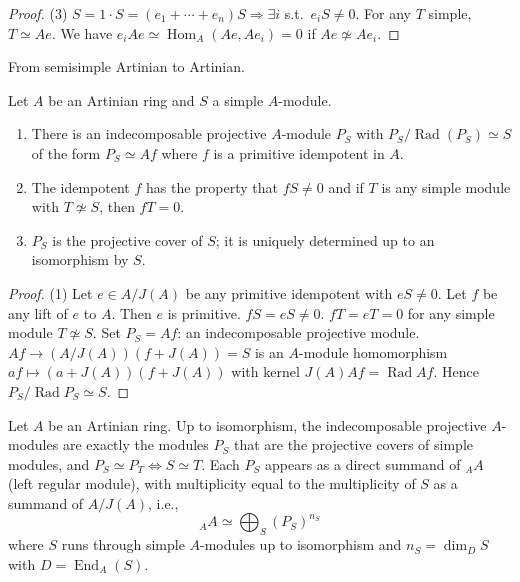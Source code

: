 \documentclass[11pt, a4paper]{report}
\begin{document}
\begin{proof}
(3) $S = 1 \cdot S = (e_{1} + \cdots + e_{n})S \Rightarrow \exists i$ s.t.\ $e_{i}S \neq 0$.
For any $T$ simple, $T \simeq Ae$. We have $e_{i}Ae \simeq \operatorname{Hom}_{A}(Ae, Ae_{i}) = 0$ if $Ae \not\simeq Ae_{i}$.
\end{proof}

\begin{theorem}
From semisimple Artinian to Artinian.

Let $A$ be an Artinian ring and $S$ a simple $A$-module.
\begin{enumerate}
\item There is an indecomposable projective $A$-module $P_{S}$ with
$P_{S}/\operatorname{Rad}(P_{S}) \simeq S$ of the form $P_{S} \simeq Af$ where $f$ is a primitive idempotent in $A$.
\item The idempotent $f$ has the property that $fS \neq 0$ and if $T$ is any simple module with $T \not\simeq S$, then $fT = 0$.
\item $P_{S}$ is the projective cover of $S$; it is uniquely determined up to an isomorphism by $S$.
\end{enumerate}
\end{theorem}

\begin{proof}
(1) Let $e \in A/J(A)$ be any primitive idempotent with $eS \neq 0$. Let $f$ be any lift of $e$ to $A$. Then $e$ is primitive.
$fS = eS \neq 0$. $fT = eT = 0$ for any simple module $T \not\simeq S$.
Set $P_{S} = Af$: an indecomposable projective module.
$Af \to (A/J(A))(f + J(A)) = S$ is an $A$-module homomorphism
$af \mapsto (a + J(A))(f + J(A))$ with kernel $J(A)Af = \operatorname{Rad}Af$.
Hence $P_{S}/\operatorname{Rad}P_{S} \simeq S$.
\end{proof}

\begin{theorem}
Let $A$ be an Artinian ring. Up to isomorphism, the indecomposable projective $A$-modules are exactly the modules $P_{S}$ that are the projective covers of simple modules, and $P_{S} \simeq P_{T} \Leftrightarrow S \simeq T$.
Each $P_{S}$ appears as a direct summand of ${}_{A}A$ (left regular module), with multiplicity equal to the multiplicity of $S$ as a summand of $A/J(A)$, i.e.,
\[
{}_{A}A \simeq \bigoplus_{S} (P_{S})^{n_{S}}
\]
where $S$ runs through simple $A$-modules up to isomorphism and $n_{S} = \operatorname{dim}_{D}S$ with $D = \operatorname{End}_{A}(S)$.
\end{theorem}
\end{document}
